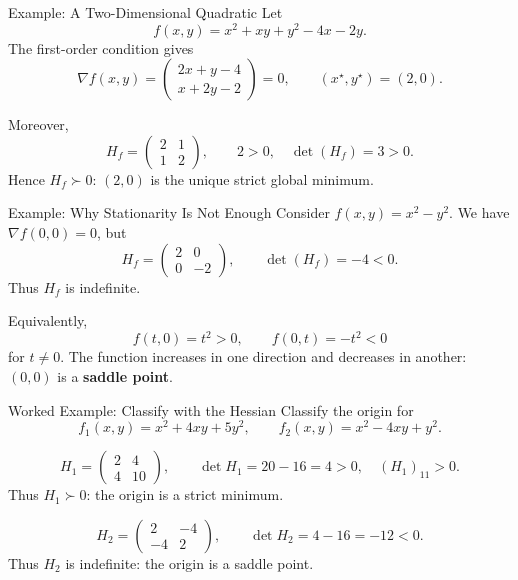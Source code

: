 \documentclass[aspectratio=169,11pt]{beamer}
\newcommand{\grad}{\nabla}
\begin{document}
\begin{frame}{Example: A Two-Dimensional Quadratic}
  Let
  \[
    f(x,y)=x^2+xy+y^2-4x-2y.
  \]
  The first-order condition gives
  \[
    \grad f(x,y)=
    \begin{pmatrix}2x+y-4\\x+2y-2\end{pmatrix}=0,
    \qquad (x^\star,y^\star)=(2,0).
  \]

  \pause
  Moreover,
  \[
    H_f=\begin{pmatrix}2&1\\1&2\end{pmatrix},
    \qquad
    2>0,\quad \det(H_f)=3>0.
  \]
  Hence $H_f\succ0$: $(2,0)$ is the unique strict global minimum.
\end{frame}

\begin{frame}{Example: Why Stationarity Is Not Enough}
  Consider $f(x,y)=x^2-y^2$. We have $\grad f(0,0)=0$, but
  \[
    H_f=\begin{pmatrix}2&0\\0&-2\end{pmatrix},
    \qquad \det(H_f)=-4<0.
  \]
  Thus $H_f$ is indefinite.

  \pause
  Equivalently,
  \[
    f(t,0)=t^2>0,
    \qquad
    f(0,t)=-t^2<0
  \]
  for $t\neq0$. The function increases in one direction and decreases in
  another: $(0,0)$ is a \textbf{saddle point}.
\end{frame}

\begin{frame}{Worked Example: Classify with the Hessian}
  Classify the origin for
  \[
    f_1(x,y)=x^2+4xy+5y^2,
    \qquad
    f_2(x,y)=x^2-4xy+y^2.
  \]

  \pause
  \[
    H_1=\begin{pmatrix}2&4\\4&10\end{pmatrix},
    \qquad
    \det H_1=20-16=4>0,\quad (H_1)_{11}>0.
  \]
  Thus $H_1\succ0$: the origin is a strict minimum.

  \pause
  \[
    H_2=\begin{pmatrix}2&-4\\-4&2\end{pmatrix},
    \qquad
    \det H_2=4-16=-12<0.
  \]
  Thus $H_2$ is indefinite: the origin is a saddle point.
\end{frame}
\end{document}
